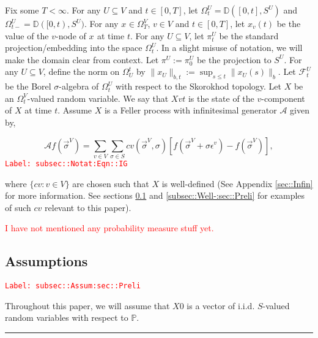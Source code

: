 \documentclass[12pt]{article}
\newcommand{\mb}{\mathbb}
\newcommand{\mc}{\mathcal}
\newcommand{\ep}{\epsilon}
\newcommand{\tr}{\textcolor{red}}
\newcommand{\labe}[1]{\tr{\texttt{Label: #1}}}
\newcommand{\ind}{\hspace{24pt}}
\newcommand{\lin}{\rule{\linewidth}{0.4 pt}}
\newcommand{\pr}{\mb{P}}							%
\newcommand{\defeq}{:=}								%
\newcommand{\cad}{\mb{D}}							%
\renewcommand{\v}{v}							%
\renewcommand{\U}{U}							%
\renewcommand{\S}{S}							%
\newcommand{\s}{\sigma}							%
\newcommand{\sv}{\vec{\s}}						%
\renewcommand{\b}{b}							%
\newcommand{\ev}{\ep}							%
\newcommand{\T}{T}								%
\newcommand{\x}{x}								%
\renewcommand{\t}{t}							%
\newcommand{\sset}{\Omega}						%
\newcommand{\proj}{\pi}							%
\renewcommand{\tt}{s}							%
\newcommand{\F}{\mc{F}}							%
\newcommand{\X}{X}								%
\newcommand{\IG}{\mc{A}}						%
\newcommand{\IGr}{c}							%
\newcommand{\vind}[1]{^{#1}}					%
\newcommand{\carp}[1]{^{#1}}					%
\newcommand{\vsi}[1]{^{#1}}						%
\newcommand{\cind}[1]{_{#1}}					%
\newcommand{\tp}[1]{(#1)}						%
\newcommand{\tip}[1]{#1}						%
\newcommand{\ts}[1]{_{#1}}						%
\begin{document}
\ind Fix some \(\T < \infty\). For any \(\U\subseteq V\) and \(\t\in [0,\T]\), let \(\sset\vsi{\U}\ts{\t} = \cad([0,\t],\S\carp{\U})\) and \(\sset\vsi{\U}\ts{\t-} = \cad([0,\t),\S\carp{\U})\). For any \(\x\cind{}\tip{} \in \sset\vsi{V}\ts{\T}\), \(\v\in V\) and  \(\t \in [0,\T]\), let \(\x\cind{\v}\tp{\t}\) be the value of the \(\v\)-node of \(\x\cind{}\tip{}\) at time \(\t\). For any \(\U\subseteq V\), let \(\proj\vsi{\U}\ts{\t}\) be the standard projection/embedding into the space \(\sset\vsi{\U}\ts{\t}\). In a slight misuse of notation, we will make the domain clear from context. Let \(\proj\vsi{\U}\ts{} \defeq \proj\vsi{\U}\ts{0}\) be the projection to \(\S\carp{\U}\). For any \(\U\subseteq V\), define the norm on \(\sset\vsi{\t}\ts{\U}\) by \(\|\x\cind{\U}\tip{}\|_{\b,\t} \defeq \sup_{\tt \leq \t} \|\x\cind{\U}\tp{\tt}\|_{\b}\). Let \(\F\vsi{\U}\ts{\t}\) be the Borel \(\sigma\)-algebra of \(\sset\vsi{\U}\ts{\t}\) with respect to the Skorokhod topology. Let \(\X{}{}\) be an \(\sset\vsi{V}\ts{\t}\)-valued random variable. We say that \(\X{\v}{\t}\) is the state of the \(\v\)-component of \(\X{}{}\) at time \(\t\). Assume \(\X{}{}\) is a Feller process with infinitesimal generator \(\IG\) given by,

\begin{equation}
\IG f(\sv\cind{}\vsi{V}) = \sum_{\v \in V}\sum_{\s \in \S} \IGr{\v}(\sv\cind{}\vsi{V},\s)[f(\sv\cind{}\vsi{V} + \s \ev\vind{\v}) - f(\sv\cind{}\vsi{V})],
\label{subsec::Notat:Eqn::IG}
\end{equation}
\labe{subsec::Notat:Eqn::IG}

where \(\{\IGr{\v}:\v\in V\}\) are chosen such that \(\X{}{}\) is well-defined (See Appendix \ref{sec::Infin} for more information. See sections \ref{subsec::Assum:sec::Preli} and \ref{subsec::Well-:sec::Preli} for examples of such \(\IGr{\v}\) relevant to this paper). 

\tr{I have not mentioned any probability measure stuff yet.}

\subsection{Assumptions}
\label{subsec::Assum:sec::Preli}\labe{subsec::Assum:sec::Preli}

Throughout this paper, we will assume that \(\X{}{0}\) is a vector of i.i.d. \(\S\)-valued random variables with respect to \(\pr\).

\lin
\end{document}
